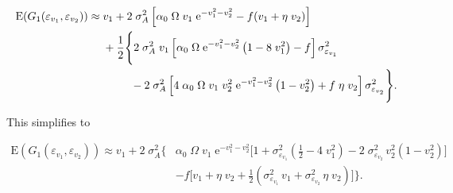 \begin{equation*}
\begin{split}
    \text{E}(G_1(\varepsilon_{v_1}, \varepsilon_{v_2})) \approx \; &
        v_1 + 2 \; \sigma_A^2 \left[ 
            \alpha_0 \; \Omega \; v_1 \; \text{e}^{-v_1^2 - v_2^2} - f (v_1 + \eta \; v_2)
        \right] \\
        &+ \frac{1}{2} \Bigg\{
            2 \; \sigma_A^2 \; v_1 \left[
                \alpha_0 \; \Omega \; \text{e}^{-v_1^2 - v_2^2} \left( 1 - 8 \; v_1^2 \right) - f
            \right] \sigma^2_{\varepsilon_{v_1}} \\
            & \hspace{2.5em} - 2 \; \sigma_A^2 \left[
                4 \; \alpha_0 \; \Omega \; v_1 \; v_2^2 \; \text{e}^{-v_1^2 - v_2^2} \left( 1 - v_2^2 \right) + f \; \eta \; v_2
            \right] \sigma^2_{\varepsilon_{v_2}}
        \Bigg\} %
%
%
%
%
\text{.}
\end{split}
\end{equation*}

This simplifies to 

\begin{equation}
\label{eq:taylor-expansion-final-supp}
\begin{split}
    \text{E}(G_1(\varepsilon_{v_1}, \varepsilon_{v_2})) \approx
        v_1 + 2 \; \sigma_A^2 \Bigg\{ 
            & \alpha_0 \; \Omega \; v_1 \; \text{e}^{-v_1^2 - v_2^2} 
            \bigg[ 
                1 + \sigma^2_{\varepsilon_{v_1}} \left( \frac{1}{2} - 4 \; v_1^2 \right)
                - 2 \; \sigma^2_{\varepsilon_{v_2}} \, v_2^2 \left( 1 - v_2^2 \right)
            \bigg] \\
            & - f \bigg[
                v_1 + \eta \; v_2 + \frac{1}{2} \left(
                    \sigma^2_{\varepsilon_{v_1}} \, v_1 + \sigma^2_{\varepsilon_{v_2}} \, \eta \; v_2
                \right)
            \bigg]
        \Bigg\}
\text{.}
\end{split}
\end{equation}









